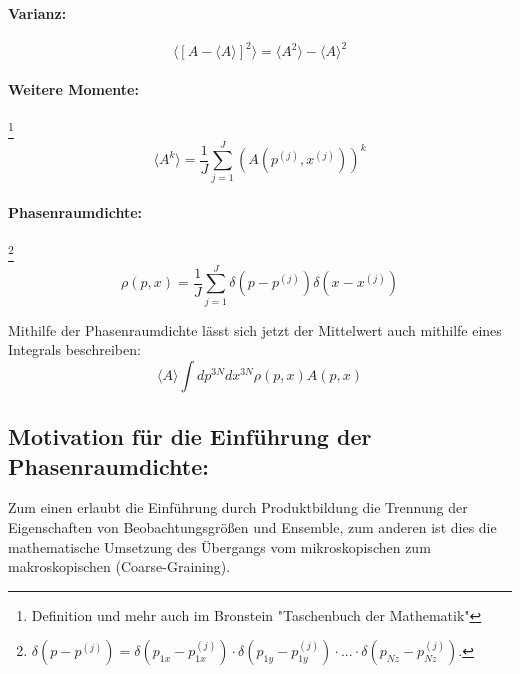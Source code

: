 	\paragraph{Varianz:}
	\[\langle [A - \langle A \rangle]^2 \rangle  = \langle A^2 \rangle - \langle A \rangle^2 \]
	\paragraph{Weitere Momente:}\footnote{Definition und mehr auch im Bronstein "Taschenbuch der Mathematik"}
	\[ \langle A^k \rangle = \frac{1}{J} \sum_{j=1}^{J}(A(p^{(j)},x^{(j)}))^k \]
	\paragraph{Phasenraumdichte:}\footnote{$ \delta(p-p^{(j)}) = \delta(p_{1x}-p_{1x}^{(j)}) \cdot \delta(p_{1y}-p_{1y}^{(j)})\cdot ... \cdot \delta(p_{Nz}-p_{Nz}^{(j)})$.}
	\[ \rho (p,x) = \frac{1}{J} \sum_{j=1}^{J} \delta(p-p^{(j)}) \delta(x-x^{(j)}) \]
	
	\noindent Mithilfe der Phasenraumdichte lässt sich jetzt der Mittelwert auch mithilfe eines Integrals beschreiben: 
	\[ \langle A \rangle \int dp^{3N} dx^{3N} \rho (p,x) A(p,x)\]
	
	\subsection{Motivation für die Einführung der Phasenraumdichte:}
	Zum einen erlaubt die Einführung durch Produktbildung die Trennung der Eigenschaften von Beobachtungsgrößen und Ensemble, zum anderen ist dies die mathematische Umsetzung des Übergangs vom mikroskopischen zum makroskopischen (Coarse-Graining). 
	
	
	
	